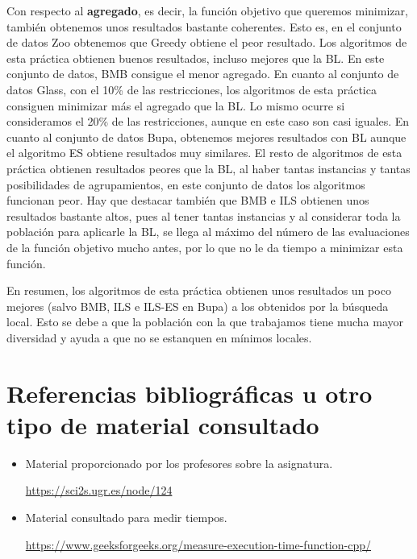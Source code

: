 Con respecto al \textbf{agregado}, es decir, la función objetivo que queremos minimizar, también obtenemos unos resultados bastante coherentes. Esto es, en el conjunto de datos Zoo obtenemos que Greedy obtiene el peor resultado. Los algoritmos de esta práctica obtienen buenos resultados, incluso mejores que la BL. 
En este conjunto de datos, BMB consigue el menor agregado.
En cuanto al conjunto de datos Glass, con el 10\% de las restricciones, los algoritmos de esta práctica consiguen minimizar más el agregado que la BL. Lo mismo ocurre si consideramos el 20\% de las restricciones, aunque en este caso son casi iguales.
En cuanto al conjunto de datos Bupa, obtenemos mejores resultados con BL aunque el algoritmo ES obtiene resultados muy similares. El resto de algoritmos de esta práctica obtienen resultados peores que la BL, al haber tantas instancias y tantas posibilidades de agrupamientos, en este conjunto de datos los algoritmos funcionan peor. 
Hay que destacar también que BMB e ILS obtienen unos resultados bastante altos, pues al tener tantas instancias y al considerar toda la población para aplicarle la BL,
se llega al máximo del número de las evaluaciones de la función objetivo mucho antes, por lo que no le da tiempo a minimizar esta función.

En resumen, los algoritmos de esta práctica obtienen unos resultados un poco mejores (salvo BMB, ILS e ILS-ES en Bupa) a los obtenidos por la búsqueda local.
Esto se debe a que la población con la que trabajamos tiene mucha mayor diversidad y ayuda a que no se estanquen en mínimos locales. 


\newpage

\section{Referencias bibliográficas u otro tipo de material consultado}

\begin{itemize}
	\item Material proporcionado por los profesores sobre la asignatura.
	
		\url{https://sci2s.ugr.es/node/124}
	\item Material consultado para medir tiempos.
	
		\url{https://www.geeksforgeeks.org/measure-execution-time-function-cpp/}
\end{itemize}
